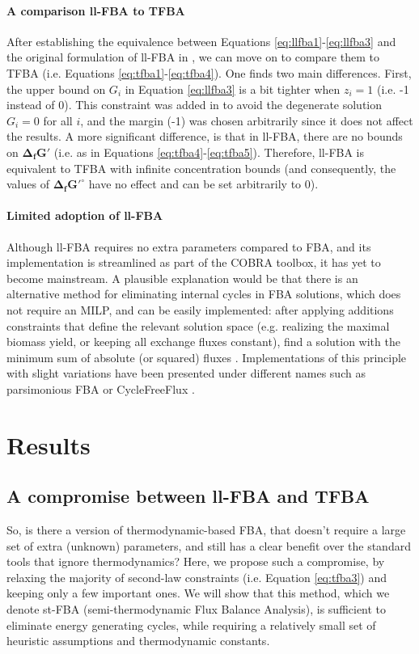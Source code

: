 \documentclass[twocolumn]{article}
\begin{document}
\paragraph{A comparison ll-FBA to TFBA} After establishing the equivalence between Equations \ref{eq:llfba1}-\ref{eq:llfba3} and the original formulation of ll-FBA in \cite{Schellenberger2011-bq}, we can move on to compare them to TFBA (i.e. Equations \ref{eq:tfba1}-\ref{eq:tfba4}). One finds two main differences. First, the upper bound on $G_i$ in Equation \ref{eq:llfba3} is a bit tighter when $z_i = 1$ (i.e. -1 instead of 0). This constraint was added in \cite{Schellenberger2011-bq} to avoid the degenerate solution $G_i = 0$ for all $i$, and the margin (-1) was chosen arbitrarily since it does not affect the results. A more significant difference, is that in ll-FBA, there are no bounds on $\mathbf{\Delta_f G'}$ (i.e. as in Equations \ref{eq:tfba4}-\ref{eq:tfba5}). Therefore, ll-FBA is equivalent to TFBA with infinite concentration bounds (and consequently, the values of $\mathbf{\Delta_f G'^\circ}$ have no effect and can be set arbitrarily to 0).

\paragraph{Limited adoption of ll-FBA} Although ll-FBA requires no extra parameters compared to FBA, and its implementation is streamlined as part of the COBRA toolbox, it has yet to become mainstream. A plausible explanation would be that there is an alternative method for eliminating internal cycles in FBA solutions, which does not require an MILP, and can be easily implemented: after applying additions constraints that  define the relevant solution space (e.g. realizing the maximal biomass yield, or keeping all exchange fluxes constant), find a solution with the minimum sum of absolute (or squared) fluxes \cite{Holzhutter2004-qj}. Implementations of this principle with slight variations have been presented under different names such as parsimonious FBA \cite{Lewis2010-rx, Schuetz2012-sv} or CycleFreeFlux \cite{Desouki2015-lh}.

\section*{Results}

\subsection*{A compromise between ll-FBA and TFBA}
So, is there a version of thermodynamic-based FBA, that doesn't require a large set of extra (unknown) parameters, and still has a clear benefit over the standard tools that ignore thermodynamics? Here, we propose such a compromise, by relaxing the majority of second-law constraints (i.e. Equation \ref{eq:tfba3}) and keeping only a few important ones. We will show that this method, which we denote st-FBA (semi-thermodynamic Flux Balance Analysis), is sufficient to eliminate energy generating cycles, while requiring a relatively small set of heuristic assumptions and thermodynamic constants.
\end{document}
